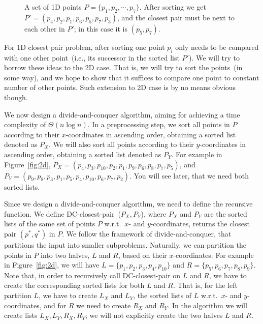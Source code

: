 \begin{figure}[h!]
\centering{}
\caption{A set of 1D points $P = \{p_1, p_2, \cdots, p_{7}\}$.
After sorting we get $P' = (p_4, p_2, p_1, p_6, p_5, p_7, p_3)$, 
and the closest pair must be next to each other in $P'$; in this case it is $(p_5, p_7)$.}
\end{figure}

For 1D closest pair problem, after sorting one point $p_i$ only needs to be compared with one other point~(i.e.,
its successor in the sorted list $P'$). We will try to borrow these ideas to the 2D case. 
That is, we will try to sort the points~(in some way), and we hope to show that it suffices to compare one point
to constant number of other points. Such extension to 2D case is by no means obvious though.

We now design a divide-and-conquer algorithm, aiming for achieving a time complexity of $\Theta(n\log n)$.
In a preprocessing step, we sort all points in $P$ according to their $x$-coordinates in ascending order, obtaining a sorted list denoted as $P_X$.
We will also sort all points according to their $y$-coordinates in ascending order, obtaining a sorted list denoted as $P_Y$.
For example in Figure~\ref{fig:2d}, $P_X = (p_4, p_3, p_{10}, p_2, p_1, p_9, p_6, p_8, p_7, p_5)$, and
$P_Y = (p_9, p_8, p_3, p_1, p_5, p_4, p_{10}, p_6, p_7, p_2)$.
You will see later, that we need both sorted lists.

Since we design a divide-and-conquer algorithm, we need to define the recursive function.
We define DC-closest-pair~($P_X, P_Y$), where $P_X$ and $P_Y$ are the sorted lists of the same set of points $P$
w.r.t.~$x$- and $y$-coordinates, returns the closest pair $(p^*, q^*)$ in $P$.
We follow the framework of divide-and-conquer, that partitions the input into smaller subproblems.
Naturally, we can partition the points in $P$ into two halves, $L$ and $R$,
based on their $x$-coordinates.  
For example in Figure~\ref{fig:2d}, we
will have $L = \{p_1, p_2, p_3, p_4, p_{10}\}$ and $R = \{p_5, p_6, p_7, p_8, p_9\}$.
Note that, in order to recursively call DC-closest-pair on $L$ and $R$, we have
to create the corresponding sorted lists for both $L$ and $R$.  That is, for
the left partition $L$, we have to create $L_X$ and $L_Y$, the sorted lists of
$L$ w.r.t.~$x$- and $y$-coordinates, and for $R$ we need to create $R_X$ and $R_Y$.
In the algorithm we will create lists $L_X, L_Y, R_X, R_Y$; we will not 
explicitly create the two halves $L$ and $R$.

